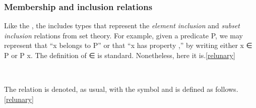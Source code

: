 \subsubsection{Membership and inclusion relations}\label{membership-and-inclusion-relations}
Like the \agdastdlib, the \ualib includes types that represent the \emph{element inclusion} and \emph{subset inclusion} relations from set theory. For example, given a predicate \af P, we may represent that  ``\ab x belongs to \af P'' or that ``\ab x has property ,'' by writing either \ab x \af ∈ \af P or \af P \ab x.  The definition of \af ∈ is standard. Nonetheless, here it is.\cref{relunary}
\ccpad
\begin{code}%
\>[0]\AgdaSpace{}%
\AgdaSymbol{:}\AgdaSpace{}%
\AgdaSpace{}%
\AgdaSpace{}%
\AgdaSpace{}%
\AgdaSpace{}%
\AgdaSpace{}%
\AgdaSpace{}%
\AgdaSpace{}%
\<%
\\
\>[0]\AgdaSpace{}%
\AgdaSpace{}%
\AgdaSpace{}%
\AgdaSymbol{=}\AgdaSpace{}%
\AgdaSpace{}%
\<%
\end{code}
\ccpad
The  relation is denoted, as usual, with the  symbol and is defined as follows.\cref{relunary}
\ccpad
\begin{code}%
\>[1]\AgdaSpace{}%
\AgdaSymbol{:}\AgdaSpace{}%
\AgdaSpace{}%
\AgdaSpace{}%
\AgdaSpace{}%
\AgdaSpace{}%
\AgdaSpace{}%
\AgdaSpace{}%
\AgdaSpace{}%
\AgdaSpace{}%
\AgdaSpace{}%
\AgdaSpace{}%
\AgdaSpace{}%
\AgdaSpace{}%
\AgdaSpace{}%
\<%
\\
%
\>[1]\AgdaSpace{}%
\AgdaSpace{}%
\AgdaSpace{}%
\AgdaSymbol{=}\AgdaSpace{}%
\AgdaSpace{}%
\AgdaSymbol{\{}\AgdaSymbol{\}}\AgdaSpace{}%
\AgdaSpace{}%
\AgdaSpace{}%
\AgdaSpace{}%
\AgdaSpace{}%
\AgdaSpace{}%
\AgdaSpace{}%
\AgdaSpace{}%
\<%
\end{code}

